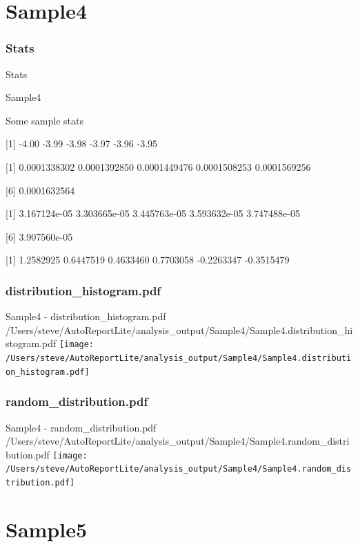 \documentclass[8pt]{beamer}\usepackage[]{graphicx}\usepackage[]{color}
\begin{document}
\section{Sample4}
\subsubsection{Stats}
\begin{frame}{Stats }
\small{
Sample4 

Some sample stats

[1] -4.00 -3.99 -3.98 -3.97 -3.96 -3.95

[1] 0.0001338302 0.0001392850 0.0001449476 0.0001508253 0.0001569256

[6] 0.0001632564

[1] 3.167124e-05 3.303665e-05 3.445763e-05 3.593632e-05 3.747488e-05

[6] 3.907560e-05

[1]  1.2582925  0.6447519  0.4633460  0.7703058 -0.2263347 -0.3515479
}

\end{frame}

\subsubsection{distribution\_histogram.pdf}
\begin{frame}{Sample4 - distribution\_histogram.pdf }
\scriptsize{/Users/steve/AutoReportLite/analysis\_output/Sample4/Sample4.distribution\_histogram.pdf}
\texttt{[image: /Users/steve/AutoReportLite/analysis\_output/Sample4/Sample4.distribution\_histogram.pdf]}
\end{frame}

\subsubsection{random\_distribution.pdf}
\begin{frame}{Sample4 - random\_distribution.pdf }
\scriptsize{/Users/steve/AutoReportLite/analysis\_output/Sample4/Sample4.random\_distribution.pdf}
\texttt{[image: /Users/steve/AutoReportLite/analysis\_output/Sample4/Sample4.random\_distribution.pdf]}
\end{frame}

\section{Sample5}
\end{document}
